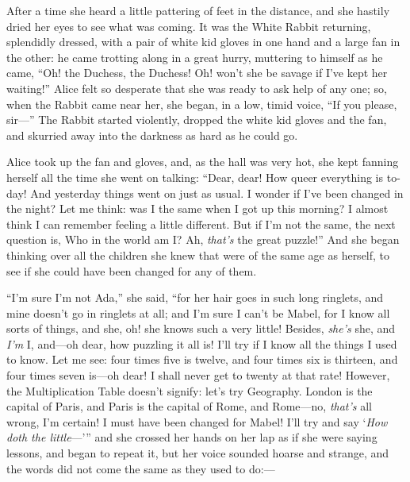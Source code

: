 \documentclass[11pt,openany,oneside]{book}
\begin{document}
After a time she heard a little pattering of feet in the distance, and she hastily dried her eyes to see what was coming. It was the White Rabbit returning, splendidly dressed, with a pair of white kid gloves in one hand and a large fan in the other: he came trotting along in a great hurry, muttering to himself as he came, “Oh! the Duchess, the Duchess! Oh! won’t she be savage if I’ve kept her waiting!” Alice felt so desperate that she was ready to ask help of any one; so, when the Rabbit came near her, she began, in a low, timid voice, “If you please, sir—” The Rabbit started violently, dropped the white kid gloves and the fan, and skurried away into the darkness as hard as he could go. 

Alice took up the fan and gloves, and, as the hall was very hot, she kept fanning herself all the time she went on talking: “Dear, dear! How queer everything is to-day! And yesterday things went on just as usual. I wonder if I’ve been changed in the night? Let me think: was I the same when I got up this morning? I almost think I can remember feeling a little different. But if I’m not the same, the next question is, Who in the world am I? Ah, {\em that’s\/} the great puzzle!” And she began thinking over all the children she knew that were of the same age as herself, to see if she could have been changed for any of them. 

“I’m sure I’m not Ada,” she said, “for her hair goes in such long ringlets, and mine doesn’t go in ringlets at all; and I’m sure I can’t be Mabel, for I know all sorts of things, and she, oh! she knows such a very little! Besides, {\em she’s\/} she, and {\em I’m\/} I, and—oh dear, how puzzling it all is! I’ll try if I know all the things I used to know. Let me see: four times five is twelve, and four times six is thirteen, and four times seven is—oh dear! I shall never get to twenty at that rate! However, the Multiplication Table doesn’t signify: let’s try Geography. London is the capital of Paris, and Paris is the capital of Rome, and Rome—no, {\em that’s\/} all wrong, I’m certain! I must have been changed for Mabel! I’ll try and say ‘{\em How doth the little\/}—’” and she crossed her hands on her lap as if she were saying lessons, and began to repeat it, but her voice sounded hoarse and strange, and the words did not come the same as they used to do:— 
\end{document}
